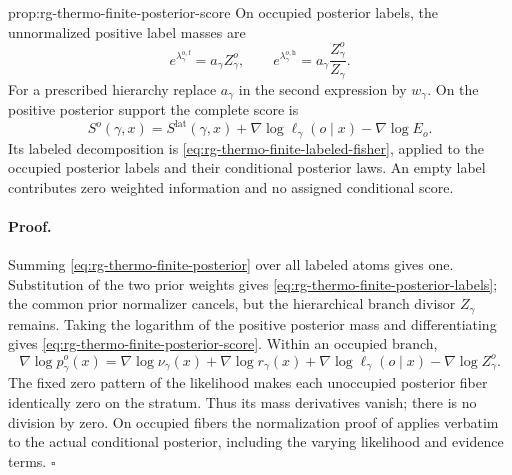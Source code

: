 {prop:rg-thermo-finite-posterior-score}
On occupied posterior labels, the unnormalized positive label masses are
\begin{equation}
 e^{\lambda_\gamma^{o,\mathrm f}}=a_\gamma Z_\gamma^o,
 \qquad
 e^{\lambda_\gamma^{o,\mathrm h}}
       =a_\gamma\frac{Z_\gamma^o}{Z_\gamma}.
 \label{eq:rg-thermo-finite-posterior-labels}
\end{equation}
For a prescribed hierarchy replace $a_\gamma$ in the second expression
by $w_\gamma$. On the positive posterior support the complete score is
\begin{equation}
 S^o(\gamma,x)=S^{\mathrm{lat}}(\gamma,x)
       +\nabla\log\ell_\gamma(o\mid x)-\nabla\log E_o.
 \label{eq:rg-thermo-finite-posterior-score}
\end{equation}
Its labeled decomposition is
\cref{eq:rg-thermo-finite-labeled-fisher}, applied to the occupied
posterior labels and their conditional posterior laws. An empty label
contributes zero weighted information and no assigned conditional score.\thermoestablishedstatus


\paragraph{Proof.}
Summing \cref{eq:rg-thermo-finite-posterior} over all labeled atoms gives
one. Substitution of the two prior weights gives
\cref{eq:rg-thermo-finite-posterior-labels}; the common prior normalizer
cancels, but the hierarchical branch divisor $Z_\gamma$ remains.
Taking the logarithm of the positive posterior mass and differentiating
gives \cref{eq:rg-thermo-finite-posterior-score}. Within an occupied branch,
\begin{equation}
 \nabla\log p_\gamma^o(x)
 =\nabla\log\nu_\gamma(x)+\nabla\log r_\gamma(x)
   +\nabla\log\ell_\gamma(o\mid x)-\nabla\log Z_\gamma^o.
 \label{eq:rg-thermo-finite-conditional-posterior-score}
\end{equation}
The fixed zero pattern of the likelihood makes each unoccupied posterior
fiber identically zero on the stratum. Thus its mass derivatives vanish;
there is no division by zero. On occupied fibers the normalization proof
of  applies verbatim to the
actual conditional posterior, including the varying likelihood and
evidence terms. $\square$

